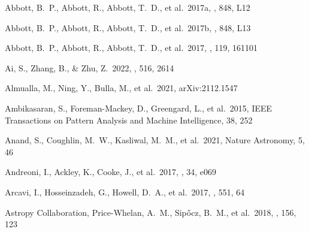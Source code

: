 \documentclass[twocolumn, twocolappendix]{aastex63}
\begin{document}

\begin{thebibliography}{}




 Abbott, B.~P., Abbott, R., Abbott, T.~D., et al.\ 2017a, \aj, 848, L12


 Abbott, B.~P., Abbott, R., Abbott, T.~D., et al.\ 2017b, \apjl, 848, L13


 Abbott, B.~P., Abbott, R., Abbott, T.~D., et al.\ 2017, \prl, 119, 161101





 Ai, S., Zhang, B., \& Zhu, Z.\ 2022, \mnras, 516, 2614


 Almualla, M., Ning, Y., Bulla, M., et al.\ 2021, arXiv:2112.1547



 Ambikasaran, S., Foreman-Mackey, D., Greengard, L., et al.\ 2015, IEEE Transactions on Pattern Analysis and Machine Intelligence, 38, 252


 Anand, S., Coughlin, M.~W., Kasliwal, M.~M., et al.\ 2021, Nature Astronomy, 5, 46


 Andreoni, I., Ackley, K., Cooke, J., et al.\ 2017, \pasa, 34, e069


 Arcavi, I., Hosseinzadeh, G., Howell, D.~A., et al.\ 2017, \nat, 551, 64




 Astropy Collaboration, Price-Whelan, A.~M., Sip{\H{o}}cz, B.~M., et al.\ 2018, \aj, 156, 123



\end{thebibliography}
\end{document}
